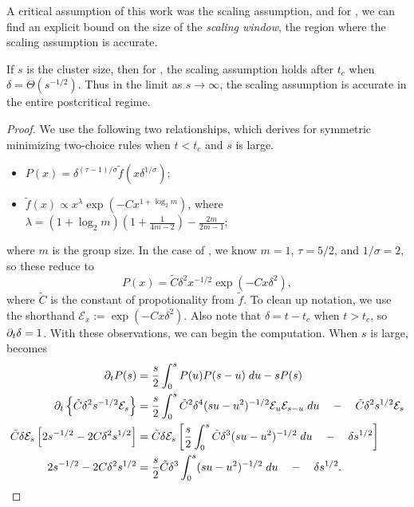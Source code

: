 \documentclass[twoside,10pt]{article}
\begin{document}
A critical assumption of this work was the scaling assumption, and for \ER, we can find an explicit bound on the size of the \textit{scaling window}, the region where the scaling assumption is accurate.

\begin{thrm}[]
	\label{crit-window}
	If $s$ is the cluster size, then for \ER, the scaling assumption holds after $t_{c}$ when $\delta = \Theta(s^{-1/2})$. Thus in the limit as $s\to \infty$, the scaling assumption is accurate in the entire postcritical regime.
\end{thrm}
\begin{proof}
	We use the following two relationships, which \cite{daCosta} derives for symmetric minimizing two-choice rules when $t < t_c$ and $s$ is large.
\begin{itemize}
        \item $P(x) = \delta^{(\tau-1)/\sigma} \tilde{f}(x \delta^{1/\sigma})$;
        \item $\tilde{f}(x) \propto x^{\lambda} \exp\left( -Cx^{1 + \log_2 m} \right)$, where $\lambda = (1+\log_2 m)\left( 1 + \frac{1}{4m-2}  \right)-\frac{2m}{2m-1} $;
\end{itemize}
where $m$ is the group size. In the case of \ER, we know $m=1$, $\tau=5/2$, and $1/\sigma = 2$, so these reduce to
\[
        P(x) = \tilde{C} \delta^{2} x^{-1/2} \exp\left( -Cx \delta^{2} \right),
\]
where $ \tilde{C}$ is the constant of propotionality from $\tilde{f}$. To clean up notation, we use the shorthand $\mathcal{E}_x := \exp\left( -C x \delta^{2} \right)$. Also note that $\delta = t-t_c$ when $t > t_c$, so $\partial_{t}{\delta} =1$. With these observations, we can begin the computation. When $s$ is large,  becomes
\begin{align*}
        \p_{t}{P}(s) &= \frac{s}{2} \int_{0}^{s} P(u)P(s-u)\;du - sP(s) \\
        \p_{t}\left\{ \tilde{C} \delta^{2}s^{-1/2}\mathcal{E}_{s} \right\} &= \frac{s}{2} \int_{0}^{s} \tilde{C}^{2}\delta^{4}(su-u^2)^{-1/2} \mathcal{E}_{u}\mathcal{E}_{s-u} \; du \quad-\quad \tilde{C}\delta^{2}s^{1/2}\mathcal{E}_{s} \\
        \tilde{C} \delta \mathcal{E}_{s} \left[ 2s^{-1/2} - 2C\delta^{2}s^{1/2} \right] &= \tilde{C} \delta \mathcal{E}_{s} \left[ \frac{s}{2} \int_{0}^{s} \tilde{C}\delta^{3}(su-u^2)^{-1/2}  \; du \quad-\quad \delta s^{1/2} \right] \\
	2s^{-1/2} - 2C \delta^{2}s^{1/2} &= \frac{s}{2} \tilde{C} \delta^3 \int_{0}^{s} (su-u^2)^{-1/2}\;du \quad-\quad \delta s^{1/2}.

\end{align*}
\end{proof}
\end{document}
